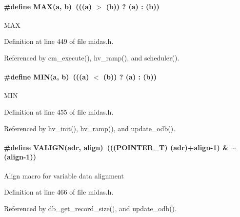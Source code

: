 \paragraph[{MAX}]{\setlength{\rightskip}{0pt plus 5cm}\#define MAX(a, \/  b)~(((a) $>$ (b)) ? (a) : (b))}\hfill\label{group__mmacroh_gafa99ec4acc4ecb2dc3c2d05da15d0e3f}
MAX 

Definition at line 449 of file midas.h.

Referenced by cm\_\-execute(), hv\_\-ramp(), and scheduler().
\paragraph[{MIN}]{\setlength{\rightskip}{0pt plus 5cm}\#define MIN(a, \/  b)~(((a) $<$ (b)) ? (a) : (b))}\hfill\label{group__mmacroh_ga3acffbd305ee72dcd4593c0d8af64a4f}
MIN 

Definition at line 455 of file midas.h.

Referenced by hv\_\-init(), hv\_\-ramp(), and update\_\-odb().
\paragraph[{VALIGN}]{\setlength{\rightskip}{0pt plus 5cm}\#define VALIGN(adr, \/  align)~(((POINTER\_\-T) (adr)+align-\/1) \& $\sim$(align-\/1))}\hfill\label{group__mmacroh_ga03bfa072452094d4d31ce3d304438f14}
Align macro for variable data alignment 

Definition at line 466 of file midas.h.

Referenced by db\_\-get\_\-record\_\-size(), and update\_\-odb().